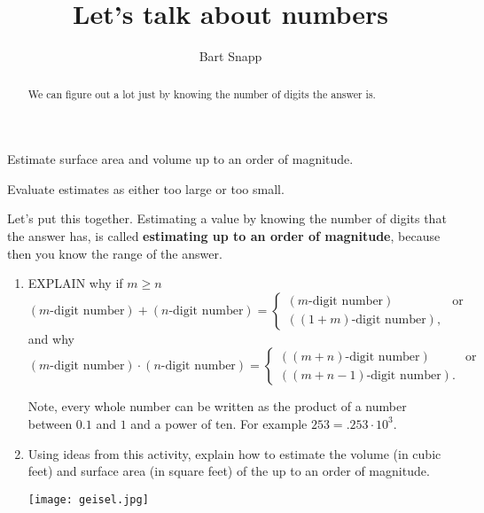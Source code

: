 \documentclass[nooutcomes,noauthor,hints]{ximera}
\title{Let's talk about numbers}
\author{Bart Snapp}
\begin{document}
\begin{abstract}
  We can figure out a lot just by knowing the number of digits the
  answer is.
\end{abstract}
\maketitle

\begin{listOutcomes}
\item Estimate surface area and volume up to an order of magnitude.
\item Evaluate estimates as either too large or too small.
\end{listOutcomes}

\begin{question}
  Let's put this together. Estimating a value by knowing the number
  of digits that the answer has, is called \textbf{estimating up to an
    order of magnitude}, because then you know the range of the
  answer.
  \begin{enumerate}
  \item EXPLAIN why if $m\ge n$
    \[
    (\text{$m$-digit number}) + (\text{$n$-digit number}) =
    \begin{cases}
      (\text{$m$-digit number}) & \text{or}\\
      (\text{$(1+m)$-digit number}),
    \end{cases}
    \]
    and why
    \[
    (\text{$m$-digit number}) \cdot (\text{$n$-digit number}) = \begin{cases}
      (\text{$(m+n)$-digit number}) & \text{or}\\
      (\text{$(m+n-1)$-digit number}).
    \end{cases}
    \]
    \begin{hint}
    Note, every whole number can be written as the product of a number
    between $0.1$ and $1$ and a power of ten. For example $253 =
    .253\cdot 10^3$.
  \end{hint}
  \item Using ideas from this activity, explain how to estimate the
    volume (in cubic feet) and surface area (in square feet) of the  up to an
    order of magnitude.

  \begin{center}
    \texttt{[image: geisel.jpg]} 
  \end{center}


\end{enumerate}
\end{question}
\end{document}
